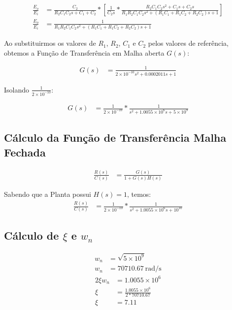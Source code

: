 \documentclass[a4paper]{article}
\begin{document}
	\begin{align}
	\frac{E_o}{E_i} &= \frac{C_2}{R_2C_1C_2s+C_1+C_2} * [\frac{1}{C_2s}*\frac{R_2C_1C_2s^2+C_1s+C_2s}{R_1R_2C_1C_2s^2+(R_1C_1+R_1C_2+R_2C_2)s+1}]\\
	\frac{E_o}{E_i} &= \frac{1}{R_1R_2C_1C_2s^2+(R_1C_1+R_1C_2+R_2C_2)s+1}
	\end{align}
	
	\vspace{0.3em}
	\par Ao substituirmos os valores de $R_1$, $R_2$, $C_1$ e $C_2$ pelos valores de referência, obtemos a Função de Transferência em Malha aberta $G(s)$:
	
	\begin{align}
	G(s) &= \frac{1}{2\times10^{-10}s^2+0.0002011s+1}
	\end{align}
	
	 \vspace{0.3em}
	\par Isolando $\frac{1}{2\times10^{-10}}$:
	
	\begin{align}
	G(s) &= \frac{1}{2\times10^{-10}}*\frac{1}{s^2 + 1.0055\times10^{6}s+5\times10^9}
	\end{align}
	\vspace{0.5em}
	
	\subsection{Cálculo da Função de Transferência Malha Fechada}
	\begin{align}
	\frac{R(s)}{C(s)} &= \frac{G(s)}{1+G(s)H(s)}
	\end{align}
	
	\par Sabendo que a Planta possui $H(s) = 1$, temos:
	\begin{align}
	\frac{R(s)}{C(s)} &= \frac{1}{2\times10^{-10}}*\frac{1}{s^2 + 1.0055\times10^{6}s+10^{10}}
	\end{align}
	
	\vspace{0.5em}
	\subsection{Cálculo de $\xi$ e $w_n$}
	\begin{align}
	w_n &= \sqrt{5\times10^9} \\
	w_n &= \SI{70710.67}{\radian/\second}
	\end{align}
	\vspace{0.5em}
	\begin{align}
	2\xi w_n &= 1.0055\times10^{6} \\
	\xi &= \frac{1.0055\times10^{6}}{2*70710.67} \\
	\xi &= 7.11
	\end{align}  
	\vspace{0.5em}
	
\end{document}
